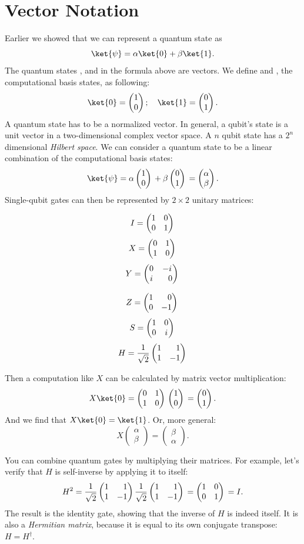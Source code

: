 \section{Vector Notation} \label{sec:matrix_notation}
Earlier we showed that we can represent a quantum state as
\begin{equation}
  \ket{\psi} = \alpha\ket{0} + \beta\ket{1}.
\end{equation}
The quantum states \ket{\psi},  and  in the formula above are vectors. We define  and , the computational basis states, as following:
\setlength\multicolsep{0pt}
\begin{equation}
  \ket{0} = \qstatezero{}; \quad \ket{1} = \qstateone{}.
\end{equation}
\noindent
A quantum state has to be a normalized vector. In general, a qubit's state is a unit vector in a two-dimensional complex vector space. A $n$ qubit state has a $2^n$ dimensional \emph{Hilbert space}. We can consider a quantum state to be a linear combination of the computational basis states:
\begin{equation}
  \ket{\psi} = \alpha\qstatezero{} + \beta\qstateone{} = \begin{pmatrix}\alpha \\ \beta\end{pmatrix}.
\end{equation}
Single-qubit gates can then be represented by $2 \times 2$ unitary matrices:
\vspace*{-4mm}
\setlength\multicolsep{0pt}
\begin{multicols}{3}
  \[
    I = \begin{pmatrix} 1 & 0 \\ 0 & 1 \end{pmatrix}{}
  \]
  \vfill
  \[
    X = \begin{pmatrix} 0 & 1 \\ 1 & 0 \end{pmatrix}{}
  \]
  \vfill
  \[
    Y = \ygate{}
  \]
\end{multicols}
\begin{multicols}{3}
  \[
    Z = \zgate{}
  \]
  \vfill
  \[
    S = \begin{pmatrix} 1 & 0 \\ 0 & i \end{pmatrix}{}
  \]
  \vfill
  \[
    H = \hgate{}
  \]
\end{multicols}
\bigskip
\noindent
Then a computation like $X$ can be calculated by matrix vector multiplication:
\begin{equation}
  X\ket{0} = \xgate{} \qstatezero{} = \qstateone{}.
\end{equation}
And we find that $X\ket{0} = \ket{1}$. Or, more general:
\begin{equation}
  X\begin{pmatrix}\alpha \\ \beta\end{pmatrix} = \begin{pmatrix}\beta \\ \alpha\end{pmatrix}.
\end{equation}

You can combine quantum gates by multiplying their matrices. For example, let's verify that $H$ is self-inverse by applying it to itself:
\begin{equation}
  H^2 = \hgate{} \hgate{} = \igate{} = I.
\end{equation}
The result is the identity gate, showing that the inverse of $H$ is indeed itself. It is also a \emph{Hermitian matrix}, because it is equal to its own conjugate transpose: $H = H^\dagger$.
